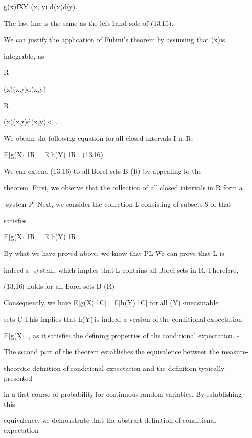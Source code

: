 g(x)fXY (x, y) d\lambda(x)d\lambda(y).

The last line is the same as the left-hand side of (13.15).

We can justify the application of Fubini's theorem by assuming that \vertg(x)\vert is

integrable, as

\int

R\times[a,b]

\vertg(x)\vertfXY (x,y)d\lambda(x,y) \leq

\int

R\timesR

\vertg(x)\vertfXY (x,y)d\lambda(x,y) < \infty .

We obtain the following equation for all closed intervals I in R:

E[g(X) 1R\timesI ]= E[h(Y) 1R\timesI ]. (13.16)

We can extend (13.16) to all Borel sets B\in {} (R) by appealing to the \pi-\lambda

theorem. First, we observe that the collection of all closed intervals in R form a

\pi-system P. Next, we consider the collection L consisting of subsets S of \Omega that

satisfies

E[g(X) 1R\timesS]= E[h(Y) 1R\timesS].

By what we have proved above, we know that P\subset L We can prove that L is

indeed a \lambda-system, which implies that L contains all Borel sets in R. Therefore,

(13.16) holds for all Borel sets B\in {} (R).

Consequently, we have E[g(X) 1C]= E[h(Y) 1C] for all \sigma(Y) -measurable

sets C This implies that h(Y) is indeed a version of the conditional expectation

E[g(X)\vertY] , as it satisfies the defining properties of the conditional expectation. \hfill $\square$

The second part of the theorem establishes the equivalence between the measure-

theoretic definition of conditional expectation and the definition typically presented

in a first course of probability for continuous random variables. By establishing this

equivalence, we demonstrate that the abstract definition of conditional expectation

